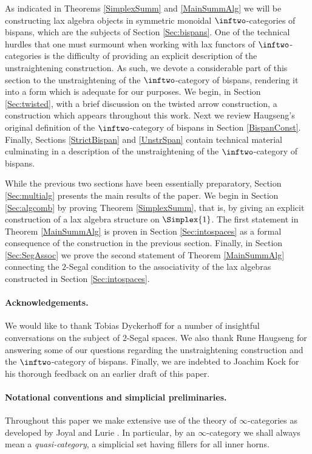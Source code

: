 \documentclass[a4paper]{article}
\numberwithin{equation}{section}
\begin{document}
As indicated in Theorems \ref{SimplexSumm} and \ref{MainSummAlg} we will be constructing lax algebra objects in symmetric monoidal $\inftwo$-categories of bispans, which are the subjects of Section \ref{Sec:bispans}. One of the technical hurdles that one must surmount when working with lax functors of $\inftwo$-categories is the difficulty of providing an explicit description of the unstraightening construction. As such, we devote a considerable part of this section to the unstraightening of the $\inftwo$-category of bispans, rendering it into a form which is adequate for our purposes. We begin, in Section \ref{Sec:twisted}, with a brief discussion on the twisted arrow construction, a construction which appears throughout this work. Next we review Haugseng's original definition of the $\inftwo$-category of bispans in Section \ref{BispanConst}. Finally, Sections \ref{StrictBispan} and \ref{UnstrSpan} contain technical material culminating in a description of the unstraightening of the $\inftwo$-category of bispans.

While the previous two sections have been essentially preparatory, Section \ref{Sec:multialg} presents the main results of the paper. We begin in Section \ref{Sec:algcomb} by proving Theorem \ref{SimplexSumm}, that is, by giving an explicit construction of a lax algebra structure on $\Simplex{1}$. The first statement in Theorem \ref{MainSummAlg} is proven in Section \ref{Sec:intospaces} as a formal consequence of the construction in the previous section. Finally, in Section \ref{Sec:SegAssoc} we prove the second statement of Theorem \ref{MainSummAlg} connecting the $2$-Segal condition to the associativity of the lax algebras constructed in Section \ref{Sec:intospaces}.

\paragraph{Acknowledgements.} We would like to thank Tobias Dyckerhoff for a number of insightful conversations on the subject of $2$-Segal spaces. We also thank Rune Haugseng for answering some of our questions regarding the unstraightening construction and the $\inftwo$-category of bispans. Finally, we are indebted to Joachim Kock for his thorough feedback on an earlier draft of this paper.

\paragraph{Notational conventions and simplicial preliminaries.} Throughout this paper we make extensive use of the theory of $\infty$-categories as developed by Joyal \cite{JoyalJPAA, JoyalUnpub} and Lurie \cite{HTT}. In particular, by an $\infty$-category we shall always mean a {\em quasi-category}, a simplicial set having fillers for all inner horns.
 
\end{document}
